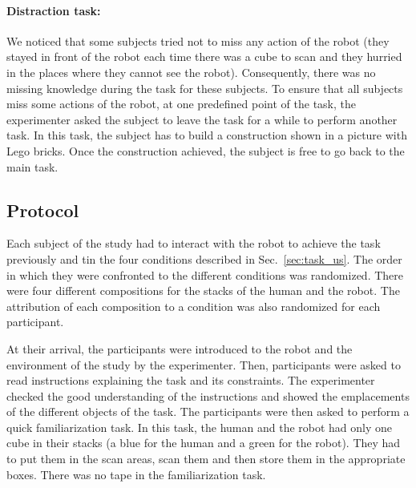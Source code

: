 \documentclass[english,a4paper,11pt,twoside]{StyleThese}
\begin{document}
\paragraph{Distraction task:}
We noticed that some subjects tried not to miss any action of the robot (they stayed in front of the robot each time there was a cube to scan and they hurried in the places where they cannot see the robot). Consequently, there was no missing knowledge during the task for these subjects. To ensure that all subjects miss some actions of the robot, at one predefined point of the task, the experimenter asked the subject to leave the task for a while to perform another task. In this task, the subject has to build a construction shown in a picture with Lego bricks. Once the construction achieved, the subject is free to go back to the main task.

\subsection{Protocol}

Each subject of the study had to interact with the robot to achieve the task previously and  tin the four conditions described in Sec.~\ref{sec:task_us}. The order in which they were confronted to the different conditions was randomized. There were four different compositions for the stacks of the human and the robot. The attribution of each composition to a condition was also randomized for each participant.

At their arrival, the participants were introduced to the robot and the environment of the study by the experimenter. Then, participants were asked to read instructions explaining the task and its constraints. The experimenter checked the good understanding of the instructions and showed the emplacements of the different objects of the task. The participants were then asked to perform a quick familiarization task. In this task, the human and the robot had only one cube in their stacks (a blue for the human and a green for the robot). They had to put them in the scan areas, scan them and then store them in the appropriate boxes. There was no tape in the familiarization task. 
\end{document}
